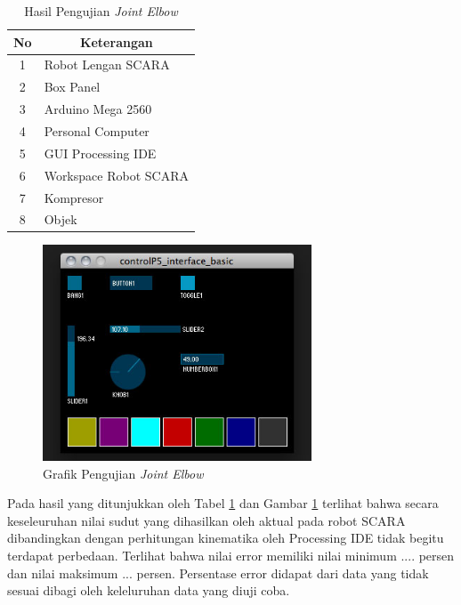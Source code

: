  \begin{table}[H]
 	\centering
 	\caption{Hasil Pengujian \textit{Joint Elbow}}
 	\label{tbl.jointelbow}
 	\begin{tabular}{|c|l|}
 		\hline
 		\rowcolor[HTML]{9B9B9B} 
 		
 		No & \multicolumn{1}{c|}{\cellcolor[HTML]{9B9B9B}Keterangan} \\ \hline
 		1  & Robot Lengan SCARA                                      \\ \hline
 		2  & Box Panel                                               \\ \hline
 		3  & Arduino Mega 2560                                       \\ \hline
 		4  & Personal Computer                                       \\ \hline
 		5  & GUI Processing IDE                                      \\ \hline
 		6  & Workspace Robot SCARA                                   \\ \hline
 		7  & Kompresor                                               \\ \hline
 		8  & Objek                                                   \\ \hline
 	\end{tabular}
 	
 \end{table} 
 \begin{figure}[H]
 	\centering
 	\includegraphics[width=8cm]{gambar/controlp5.jpg}
 	\caption{Grafik Pengujian \textit{Joint Elbow}}
 	\label{pic.jointelbow}
 \end{figure}
 
 Pada hasil yang ditunjukkan oleh Tabel \ref{tbl.jointelbow} dan Gambar \ref{pic.jointelbow} terlihat bahwa secara keseleuruhan nilai sudut yang dihasilkan oleh aktual pada robot SCARA dibandingkan dengan perhitungan kinematika oleh Processing IDE tidak begitu terdapat perbedaan. Terlihat bahwa nilai error
 memiliki nilai minimum .... persen dan nilai maksimum ... persen. Persentase error didapat dari data yang tidak sesuai dibagi oleh keleluruhan data yang diuji coba. 